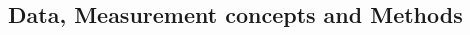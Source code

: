 \documentclass[twoside]{article}\usepackage[]{graphicx}\usepackage[]{color}
\begin{document}
\begin{multicols}{2}






\section{Data, Measurement concepts and Methods}


\end{multicols}
\end{document}
